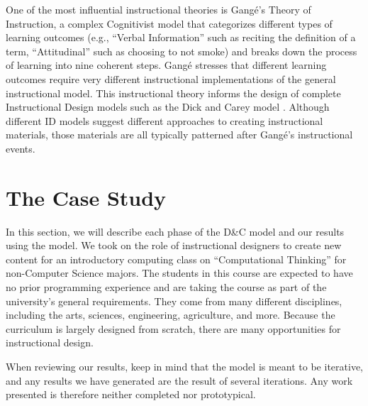 \documentclass{sig-alternate}
\begin{document}


One of the most influential\cite{anglin1992reference} instructional theories is Gang\'{e}'s Theory of Instruction, a complex Cognitivist model that categorizes different types of learning outcomes (e.g., ``Verbal Information'' such as reciting the definition of a term, ``Attitudinal'' such as choosing to not smoke) and breaks down the process of learning into nine coherent steps. Gang\'{e} stresses that different learning outcomes require very different instructional implementations of the general instructional model. This instructional theory informs the design of complete Instructional Design models such as the Dick and Carey model \cite{carey2001systematic}. Although different ID models suggest different approaches to creating instructional materials, those materials are all typically patterned after Gang\'{e}'s instructional events.

\section{The Case Study}

In this section, we will describe each phase of the D\&C model and our results using the model.
We took on the role of instructional designers to create new content for an introductory computing class on ``Computational Thinking'' for non-Computer Science majors.
The students in this course are expected to have no prior programming experience and are taking the course as part of the university's general requirements.
They come from many different disciplines, including the arts, sciences, engineering, agriculture, and more.
Because the curriculum is largely designed from scratch, there are many opportunities for instructional design.

When reviewing our results, keep in mind that the model is meant to be iterative, and any results we have generated are the result of several iterations. 
Any work presented is therefore neither completed nor prototypical.
\end{document}
